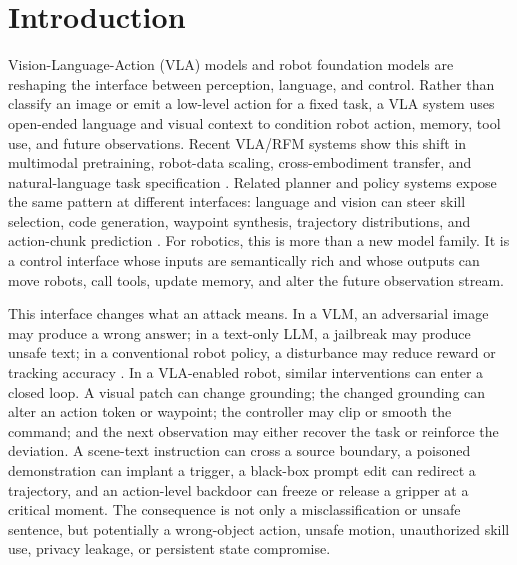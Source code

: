 \section{Introduction}
\label{sec:introduction}

Vision-Language-Action (VLA) models and robot foundation models are reshaping the interface between perception, language, and control. Rather than classify an image or emit a low-level action for a fixed task, a VLA system uses open-ended language and visual context to condition robot action, memory, tool use, and future observations. Recent VLA/RFM systems show this shift in multimodal pretraining, robot-data scaling, cross-embodiment transfer, and natural-language task specification \cite{driess2023palme,brohan2022rt1,brohan2023rt2,jiang2023vima,openx2023} \cite{kim24openvla,ghosh2024octo,black2024pi0,bousmalis2023robocat,wu2023gr1} \cite{li2023roboflamingo,cheang2024gr2,wang2025unified,nvidia2025gr00tn1,wang2025vlaadapter}. Related planner and policy systems expose the same pattern at different interfaces: language and vision can steer skill selection, code generation, waypoint synthesis, trajectory distributions, and action-chunk prediction \cite{ahn2022saycan,liang2023code,singh2023progprompt,huang2023voxposer,shridhar2022cliport} \cite{chi2023diffusion,zhao2023act,pertsch2025fast,liu2024rdt,reuss2024mdt}. For robotics, this is more than a new model family. It is a control interface whose inputs are semantically rich and whose outputs can move robots, call tools, update memory, and alter the future observation stream.

This interface changes what an attack means. In a VLM, an adversarial image may produce a wrong answer; in a text-only LLM, a jailbreak may produce unsafe text; in a conventional robot policy, a disturbance may reduce reward or tracking accuracy \cite{qi2024visual,zou2023universal,huang2017adversarial,pinto2017robust,gleave2020adversarial}. In a VLA-enabled robot, similar interventions can enter a closed loop. A visual patch can change grounding; the changed grounding can alter an action token or waypoint; the controller may clip or smooth the command; and the next observation may either recover the task or reinforce the deviation. A scene-text instruction can cross a source boundary, a poisoned demonstration can implant a trigger, a black-box prompt edit can redirect a trajectory, and an action-level backdoor can freeze or release a gripper at a critical moment. The consequence is not only a misclassification or unsafe sentence, but potentially a wrong-object action, unsafe motion, unauthorized skill use, privacy leakage, or persistent state compromise.

